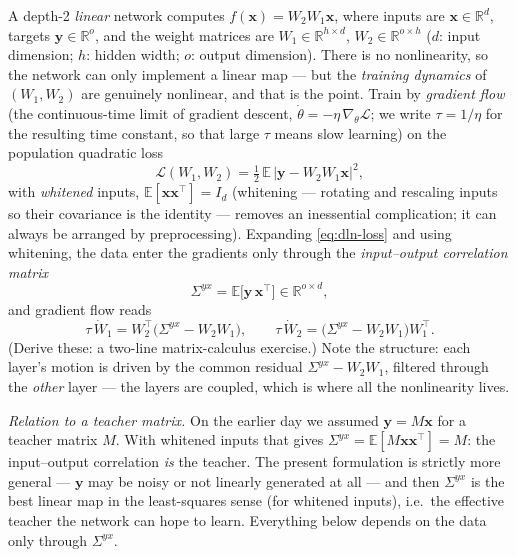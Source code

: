 \documentclass[11pt]{article}
\newcommand{\R}{\mathbb{R}}
\newcommand{\E}{\mathbb{E}}
\newcommand{\bv}[1]{\boldsymbol{#1}}
\begin{document}
A depth-2 \emph{linear} network computes $f(\bv{x}) = W_2 W_1 \bv{x}$,
where inputs are $\bv{x} \in \R^d$, targets $\bv{y} \in \R^{o}$, and the
weight matrices are $W_1 \in \R^{h \times d}$, $W_2 \in \R^{o \times h}$
($d$: input dimension; $h$: hidden width; $o$: output dimension). There is
no nonlinearity, so
the network can only implement a linear map --- but the \emph{training
dynamics} of $(W_1, W_2)$ are genuinely nonlinear, and that is the point.
Train by \emph{gradient flow} (the continuous-time limit of gradient
descent, $\dot\theta = -\eta\,\nabla_\theta\mathcal{L}$; we write
$\tau = 1/\eta$ for the resulting time constant, so that large $\tau$
means slow learning) on the population quadratic loss
\begin{equation}
  \label{eq:dln-loss}
  \mathcal{L}(W_1, W_2)
  = \tfrac12\, \E\,\bigl|\bv{y} - W_2 W_1 \bv{x}\bigr|^2 ,
\end{equation}
with \emph{whitened} inputs, $\E[\bv{x}\bv{x}^{\top}] = I_d$ (whitening ---
rotating and rescaling inputs so their covariance is the identity ---
removes an inessential complication; it can always be arranged by
preprocessing). Expanding \cref{eq:dln-loss} and using whitening, the data
enter the gradients only through the \emph{input--output correlation
matrix}
\begin{equation}
  \label{eq:sigma-yx}
  \Sigma^{yx} = \E\bigl[\bv{y}\,\bv{x}^{\top}\bigr] \in \R^{o\times d},
\end{equation}
and gradient flow reads
\begin{equation}
  \label{eq:dln-flow}
  \tau\,\dot W_1 = W_2^{\top}\bigl(\Sigma^{yx} - W_2 W_1\bigr),
  \qquad
  \tau\,\dot W_2 = \bigl(\Sigma^{yx} - W_2 W_1\bigr) W_1^{\top} .
\end{equation}
(Derive these: a two-line matrix-calculus exercise.) Note the structure:
each layer's motion is driven by the common residual $\Sigma^{yx} - W_2
W_1$, filtered through the \emph{other} layer --- the layers are coupled,
which is where all the nonlinearity lives.

\emph{Relation to a teacher matrix.} On the earlier day we assumed
$\bv{y} = M\bv{x}$ for a teacher matrix $M$. With whitened inputs that
gives $\Sigma^{yx} = \E[M\bv{x}\bv{x}^\top] = M$: the input--output
correlation \emph{is} the teacher. The present formulation is strictly more
general --- $\bv{y}$ may be noisy or not linearly generated at all --- and
then $\Sigma^{yx}$ is the best linear map in the least-squares sense
(for whitened inputs), i.e.\ the effective teacher the network can hope to
learn. Everything below depends on the data only through $\Sigma^{yx}$.
\end{document}

